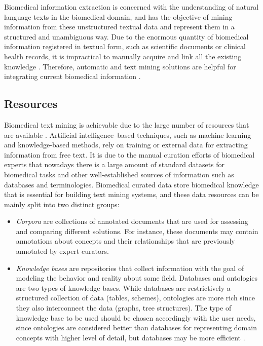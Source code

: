 Biomedical information extraction is concerned with the understanding of natural language texts in the biomedical domain, and has the objective of mining information from these unstructured textual data and represent them in a structured and unambiguous way.
Due to the enormous quantity of biomedical information registered in textual form, such as scientific documents or clinical health records, it is impractical to manually acquire and link all the existing knowledge \parencite{cases2013a}.
Therefore, automatic  and text mining solutions are helpful for integrating current biomedical information \parencite{krallinger2005a,ananiadou2006a}.


\subsection{Resources}
\label{c2:ss:resources}

Biomedical text mining is achievable due to the large number of resources that are available \parencite{simpson2012a,rebholzschuhmann2012a,zhu2013a,przybyla2016a,rosarioferreira2021a}.
Artificial intelligence--based techniques, such as machine learning and knowledge-based methods, rely on training or external data for extracting information from free text.
It is due to the manual curation efforts of biomedical experts that nowadays there is a large amount of standard datasets for biomedical  tasks and other well-established sources of information such as databases and terminologies.
Biomedical curated data store biomedical knowledge that is essential for building text mining systems, and these data resources can be mainly split into two distinct groups:

\begin{itemize}

\item
\textit{Corpora} are collections of annotated documents that are used for assessing and comparing different  solutions.
For instance, these documents may contain annotations about concepts and their relationships that are previously annotated by expert curators.

\item
\textit{Knowledge bases} are repositories that collect information with the goal of modeling the behavior and reality about some field.
Databases and ontologies are two types of knowledge bases.
While databases are restrictively a structured collection of data (tables, schemes), ontologies are more rich since they also interconnect the data (graphs, tree structures).
The type of knowledge base to be used should be chosen accordingly with the user needs, since ontologies are considered better than databases for representing domain concepts with higher level of detail, but databases may be more efficient \parencite{martinezcruz2012a}.

\end{itemize}

